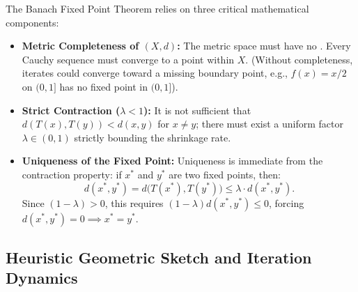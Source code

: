 \begin{content}

\begin{steps}
The Banach Fixed Point Theorem relies on three critical mathematical components:
\begin{itemize}
    \item \textbf{Metric Completeness of $(X, d)$:} The metric space must have no . Every Cauchy sequence must converge to a point within $X$. (Without completeness, iterates could converge toward a missing boundary point, e.g., $f(x) = x/2$ on $(0, 1]$ has no fixed point in $(0, 1]$).
    \item \textbf{Strict Contraction ($\lambda < 1$):} It is not sufficient that $d(T(x), T(y)) < d(x, y)$ for $x \neq y$; there must exist a uniform factor $\lambda \in (0, 1)$ strictly bounding the shrinkage rate.
    \item \textbf{Uniqueness of the Fixed Point:} Uniqueness is immediate from the contraction property: if $x^*$ and $y^*$ are two fixed points, then:
    \[
    d(x^*, y^*) = d\bigl(T(x^*), T(y^*)\bigr) \le \lambda \cdot d(x^*, y^*).
    \]
    Since $(1 - \lambda) > 0$, this requires $(1 - \lambda) d(x^*, y^*) \le 0$, forcing $d(x^*, y^*) = 0 \implies x^* = y^*$.
\end{itemize}
\end{steps}
\end{content}

\subsection{Heuristic Geometric Sketch and Iteration Dynamics}

